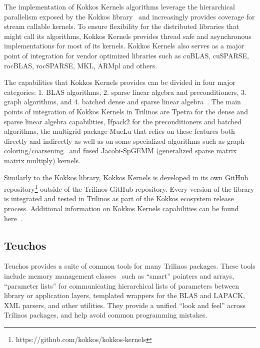 The implementation of Kokkos Kernels algorithms leverage the hierarchical parallelism
exposed by the Kokkos library~\cite{kim2017designing} and increasingly provides coverage
for stream callable kernels. To ensure flexibility for the distributed libraries that
might call its algorithms, Kokkos Kernels provides thread safe and asynchronous
implementations for most of its kernels. Kokkos Kernels also serves as a major point of
integration for vendor optimized libraries such as cuBLAS, cuSPARSE, rocBLAS, rocSPARSE,
MKL, ARMpl and others.

The capabilities that Kokkos Kernels provides can be divided in four major categories:
1. BLAS algorithms, 2. sparse linear algebra and preconditioners, 3. graph algorithms, and
4. batched dense and sparse linear algebra~\cite{liegeois2023performance}. The main
points of integration of Kokkos Kernels in Trilinos are Tpetra for the dense and sparse
linear algebra capabilities, Ifpack2 for the preconditioners and batched algorithms,
the multigrid package MueLu that relies on these features both directly and indirectly
as well as on some specialized algorithms such as graph
coloring/coarsening~\cite{kelley2022parallel} and fused Jacobi-SpGEMM (generalized sparse matrix matrix multiply) kernels.

Similarly to the Kokkos library, Kokkos Kernels is developed in its own GitHub
repository\footnote{https://github.com/kokkos/kokkos-kernels} outside of the Trilinos
GitHub repository. Every version of the library is integrated and tested in Trilinos
as part of the Kokkos ecosystem release process. Additional information on Kokkos
Kernels capabilities can be found here~\cite{deveci2018multithreaded,wolf2017fast}.


\subsection{Teuchos}

Teuchos provides a suite of common tools for many Trilinos packages. These tools include memory management classes~\cite{bartlett2010} such as ``smart'' pointers and arrays, ``parameter lists'' for communicating hierarchical lists of parameters between library or application layers, templated wrappers for the BLAS and LAPACK, XML parsers, and other utilities. They provide a unified ``look and feel'' across Trilinos packages, and help avoid common programming mistakes.



